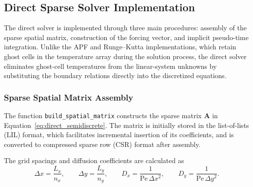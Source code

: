 \subsection{Direct Sparse Solver Implementation}
\label{subsec:direct_implementation}

The direct solver is implemented through three main procedures:
assembly of the sparse spatial matrix, construction of the
forcing vector, and implicit pseudo-time integration. Unlike
the APF and Runge--Kutta implementations, which retain ghost
cells in the temperature array during the solution process,
the direct solver eliminates ghost-cell temperatures from
the linear-system unknowns by substituting the boundary
relations directly into the discretized equations.

\subsubsection{Sparse Spatial Matrix Assembly}

The function \texttt{build\_spatial\_matrix} constructs the
sparse matrix $\mathbf{A}$ in
Equation~\eqref{eq:direct_semidiscrete}. The matrix is initially
stored in the list-of-lists (LIL) format, which facilitates
incremental insertion of its coefficients, and is converted
to compressed sparse row (CSR) format after assembly.

The grid spacings and diffusion coefficients are calculated as
\begin{equation}
\Delta x=\frac{L_x}{n_x},
\qquad
\Delta y=\frac{L_y}{n_y},
\qquad
D_x=\frac{1}{\mathrm{Pe}\,\Delta x^2},
\qquad
D_y=\frac{1}{\mathrm{Pe}\,\Delta y^2}.
\label{eq:direct_implementation_coefficients}
\end{equation}


